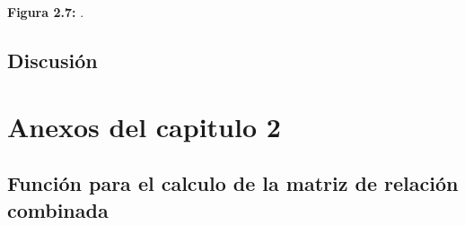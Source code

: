 \documentclass[11pt,spanish,a4paper,oneside,]{book} %
\begin{document}
\begin{center}
\textbf{Figura 2.7:} .

\end{center}

\hypertarget{discussion2}{%
\section{Discusión}\label{discussion2}}

\hypertarget{appendix-appendix}{%
\appendix}


\hypertarget{anexos-del-capitulo-2}{%
\chapter{Anexos del capitulo 2}\label{anexos-del-capitulo-2}}

\hypertarget{funciuxf3n-para-el-calculo-de-la-matriz-de-relaciuxf3n-combinada}{%
\section{Función para el calculo de la matriz de relación combinada}\label{funciuxf3n-para-el-calculo-de-la-matriz-de-relaciuxf3n-combinada}}
\end{document}
